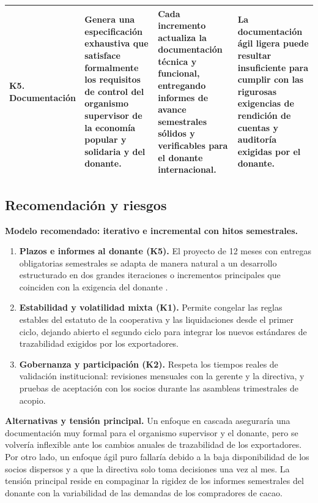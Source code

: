 \documentclass[11pt,a4paper]{article}
\begin{document}
\begin{xltabular}{\textwidth}{|p{0.17\textwidth}|X|X|X|}
K5. Documentación &
Genera una especificación exhaustiva que satisface formalmente los requisitos de control del organismo supervisor de la economía popular y solidaria y del donante. &
Cada incremento actualiza la documentación técnica y funcional, entregando informes de avance semestrales sólidos y verificables para el donante internacional. &
La documentación ágil ligera puede resultar insuficiente para cumplir con las rigurosas exigencias de rendición de cuentas y auditoría exigidas por el donante.
\\ \hline
\end{xltabular}
\endgroup

\subsection{Recomendación y riesgos}

\textbf{Modelo recomendado: iterativo e incremental con hitos semestrales.}

\begin{enumerate}
    \item \textbf{Plazos e informes al donante (K5).} El proyecto de 12 meses con entregas obligatorias semestrales se adapta de manera natural a un desarrollo estructurado en dos grandes iteraciones o incrementos principales que coinciden con la exigencia del donante \cite[sec.~5.5]{materialGA}.
    \item \textbf{Estabilidad y volatilidad mixta (K1).} Permite congelar las reglas estables del estatuto de la cooperativa y las liquidaciones desde el primer ciclo, dejando abierto el segundo ciclo para integrar los nuevos estándares de trazabilidad exigidos por los exportadores.
    \item \textbf{Gobernanza y participación (K2).} Respeta los tiempos reales de validación institucional: revisiones mensuales con la gerente y la directiva, y pruebas de aceptación con los socios durante las asambleas trimestrales de acopio.
\end{enumerate}

\textbf{Alternativas y tensión principal.}
Un enfoque en cascada aseguraría una documentación muy formal para el organismo supervisor y el donante, pero se volvería inflexible ante los cambios anuales de trazabilidad de los exportadores. Por otro lado, un enfoque ágil puro fallaría debido a la baja disponibilidad de los socios dispersos y a que la directiva solo toma decisiones una vez al mes. La tensión principal reside en compaginar la rigidez de los informes semestrales del donante con la variabilidad de las demandas de los compradores de cacao.
\end{document}
